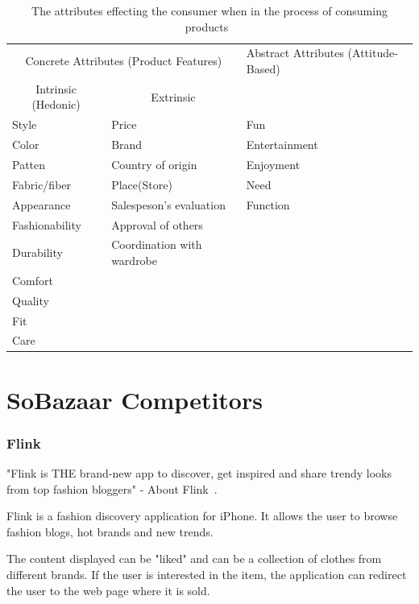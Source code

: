 \begin{table}[H]
    \centering
    \begin{tabular}{lll}
    \toprule
      \multicolumn{2}{c}{Concrete Attributes (Product Features)} & Abstract Attributes (Attitude-Based) \\
      \cmidrule(r{1em}){1-2}
      \multicolumn{1}{c}{Intrinsic (Hedonic)} & \multicolumn{1}{c}{Extrinsic} 				 	& \\ \midrule
      Style 				& Price						 	& Fun \\
      Color				& Brand 					 	& Entertainment \\
      Patten 				& Country of origin			 	& Enjoyment\\
      Fabric/fiber 		& Place(Store) 				 	& Need \\
      Appearance	   	 	& Salespeson's evaluation	 	&  Function\\
      Fashionability  	& Approval of others 		 	&\\
      Durability			& Coordination with wardrobe 	&\\
      Comfort				&								& \\
      Quality				&								& \\
      Fit					&								& \\
      Care 				&								& \\
    \bottomrule
    \end{tabular}
    \caption[Consumers' Purchase Decisions]{The attributes effecting the consumer when in the process of consuming products~\cite{dutton2006}}
    \label{table:ConsumersPurchaseDec}
\end{table}

\section{SoBazaar Competitors}\label{app:sec:soCompetitors}
\subsubsection{Flink} %
\label{par:flink}

"Flink is THE brand-new app to discover, get inspired and share trendy
looks from top fashion bloggers" - About Flink~\cite{flink}.

Flink is a fashion discovery application for iPhone.
It allows the user to browse fashion blogs, hot brands and new trends.

The content displayed can be "liked" and can be a collection of clothes from different brands.
If the user is interested in the item, the application can redirect the user to the web page where it is sold.


